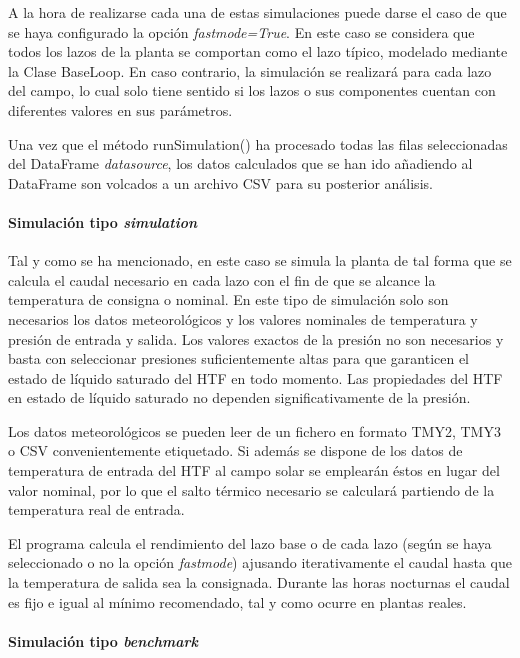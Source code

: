 A la hora de realizarse cada una de estas simulaciones puede darse el
caso de que se haya configurado la opción \emph{fastmode=True}. En este
caso se considera que todos los lazos de la planta se comportan como el
lazo típico, modelado mediante la Clase BaseLoop. En caso contrario, la
simulación se realizará para cada lazo del campo, lo cual solo tiene
sentido si los lazos o sus componentes cuentan con diferentes valores en
sus parámetros.

Una vez que el método runSimulation() ha procesado todas las filas
seleccionadas del DataFrame \emph{datasource}, los datos calculados que
se han ido añadiendo al DataFrame son volcados a un archivo CSV para su
posterior análisis.

\hypertarget{simulaciuxf3n-tipo-simulation}{%
\paragraph{\texorpdfstring{Simulación tipo
\emph{simulation}}{Simulación tipo simulation}}\label{simulaciuxf3n-tipo-simulation}}

Tal y como se ha mencionado, en este caso se simula la planta de tal
forma que se calcula el caudal necesario en cada lazo con el fin de que
se alcance la temperatura de consigna o nominal. En este tipo de
simulación solo son necesarios los datos meteorológicos y los valores
nominales de temperatura y presión de entrada y salida. Los valores
exactos de la presión no son necesarios y basta con seleccionar
presiones suficientemente altas para que garanticen el estado de líquido
saturado del HTF en todo momento. Las propiedades del HTF en estado de
líquido saturado no dependen significativamente de la presión.

Los datos meteorológicos se pueden leer de un fichero en formato TMY2,
TMY3 o CSV convenientemente etiquetado. Si además se dispone de los
datos de temperatura de entrada del HTF al campo solar se emplearán
éstos en lugar del valor nominal, por lo que el salto térmico necesario
se calculará partiendo de la temperatura real de entrada.

El programa calcula el rendimiento del lazo base o de cada lazo (según
se haya seleccionado o no la opción \emph{fastmode}) ajusando
iterativamente el caudal hasta que la temperatura de salida sea la
consignada. Durante las horas nocturnas el caudal es fijo e igual al
mínimo recomendado, tal y como ocurre en plantas reales.

\hypertarget{simulaciuxf3n-tipo-benchmark}{%
\paragraph{\texorpdfstring{Simulación tipo
\emph{benchmark}}{Simulación tipo benchmark}}\label{simulaciuxf3n-tipo-benchmark}}

